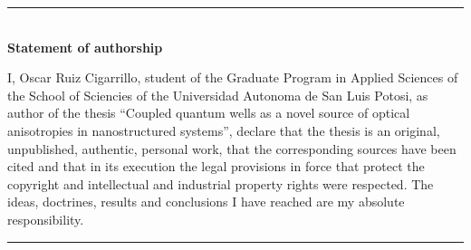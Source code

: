 \cleardoublepage
\begin{vcentrepage}

	\noindent\rule[2pt]{\textwidth}{0.8pt}\\
	{\large\textbf{Statement of authorship }}
	\begin{center}
		\justifying
        I, Oscar Ruiz Cigarrillo, student of the Graduate Program in Applied Sciences of the School of Sciencies of the Universidad Autonoma de San Luis Potosi, as author of the thesis ``Coupled quantum wells as a novel source of optical anisotropies in nanostructured systems'', declare that the thesis is an original, unpublished, authentic, personal work, that the corresponding sources have been cited and that in its execution the legal provisions in force that protect the copyright and intellectual and industrial property rights were respected. The ideas, doctrines, results and conclusions I have reached are my absolute responsibility.
	\end{center}
	\noindent\rule[2pt]{\textwidth}{0.8pt}

\end{vcentrepage}

%